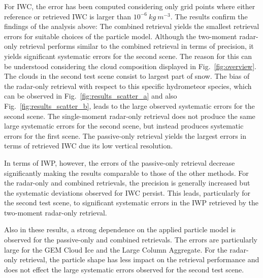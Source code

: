 \documentclass[journal abbreviation, manuscript]{copernicus}
\begin{document}
For IWC, the error has been computed considering only grid points where either
reference or retrieved IWC is larger than $10^{-6}\ \unit{kg\ m^{-3}}$. The
results confirm the findings of the analysis above: The combined retrieval
yields the smallest retrieval errors for suitable choices of the particle model.
Although the two-moment radar-only retrieval performs similar to the combined
retrieval in terms of precision, it yields significant systematic errors for the
second scene. The reason for this can be understood considering the cloud
composition displayed in Fig.~\ref{fig:overview}. The clouds in the second test
scene consist to largest part of snow. The bias of the radar-only retrieval with
respect to this specific hydrometeor species, which can be observed in
Fig.~\ref{fig:results_scatter_a} and also Fig.~\ref{fig:results_scatter_b},
leads to the large observed systematic errors for the second scene. The
single-moment radar-only retrieval does not produce the same large systematic
errors for the second scene, but instead produces systematic errors for the
first scene. The passive-only retrieval yields the largest errors in terms of
retrieved IWC due its low vertical resolution.

In terms of IWP, however, the errors of the passive-only retrieval decrease
significantly making the results comparable to those of the other methods. For
the radar-only and combined retrievals, the precision is generally increased but
the systematic deviations observed for IWC persist. This leads, particularly for
the second test scene, to significant systematic errors in the
IWP retrieved by the two-moment radar-only retrieval.

Also in these results, a strong dependence on the applied particle model is
observed for the passive-only and combined retrievals. The errors are
particularly large for the GEM Cloud Ice and the Large Column Aggregate. For the
radar-only retrieval, the particle shape has less impact on the retrieval
performance and does not effect the large systematic errors observed for the
second test scene.
\end{document}
